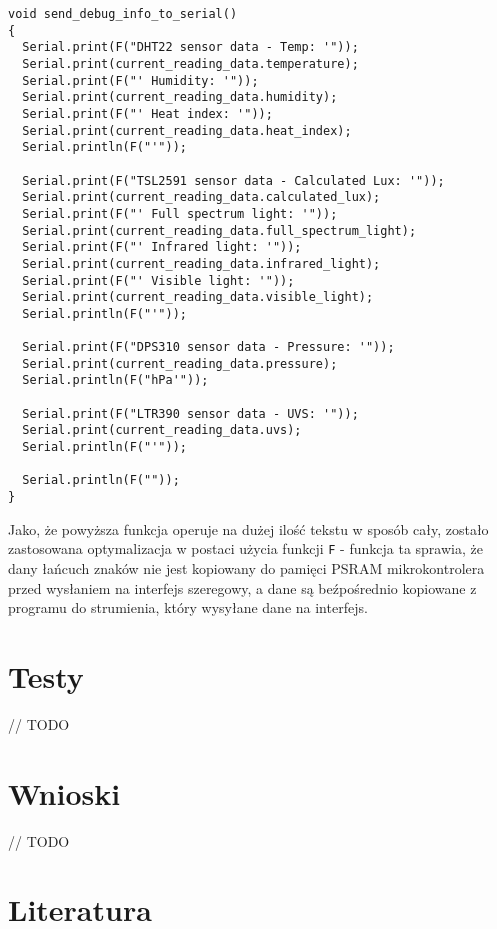 \documentclass[12pt,a4paper]{article}
\begin{document}
\begin{verbatim}
void send_debug_info_to_serial()
{
  Serial.print(F("DHT22 sensor data - Temp: '"));
  Serial.print(current_reading_data.temperature);
  Serial.print(F("' Humidity: '"));
  Serial.print(current_reading_data.humidity);
  Serial.print(F("' Heat index: '"));
  Serial.print(current_reading_data.heat_index);
  Serial.println(F("'"));

  Serial.print(F("TSL2591 sensor data - Calculated Lux: '"));
  Serial.print(current_reading_data.calculated_lux);
  Serial.print(F("' Full spectrum light: '"));
  Serial.print(current_reading_data.full_spectrum_light);
  Serial.print(F("' Infrared light: '"));
  Serial.print(current_reading_data.infrared_light);
  Serial.print(F("' Visible light: '"));
  Serial.print(current_reading_data.visible_light);
  Serial.println(F("'"));

  Serial.print(F("DPS310 sensor data - Pressure: '"));
  Serial.print(current_reading_data.pressure);
  Serial.println(F("hPa'"));

  Serial.print(F("LTR390 sensor data - UVS: '"));
  Serial.print(current_reading_data.uvs);
  Serial.println(F("'"));

  Serial.println(F(""));
}
\end{verbatim}

Jako, że powyższa funkcja operuje na dużej ilość tekstu w sposób cały, zostało zastosowana optymalizacja w postaci użycia funkcji 
\texttt{F} - funkcja ta sprawia, że dany łańcuch znaków nie jest kopiowany do pamięci PSRAM mikrokontrolera przed wysłaniem na interfejs szeregowy, 
a dane są beźpośrednio kopiowane z programu do strumienia, który wysyłane dane na interfejs. 

\section{Testy}
// TODO

\section{Wnioski}
// TODO

\section{Literatura}
\end{document}
